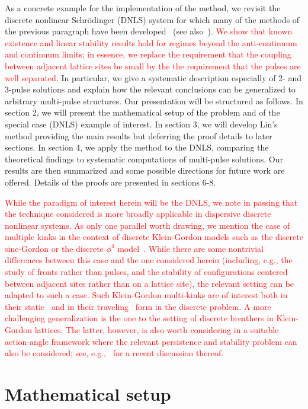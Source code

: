 \documentclass[12pt]{elsarticle}
\newcommand{\revised}[1]{ \textcolor{red}{#1} }
\begin{document}
As a concrete example for the implementation of the method, we revisit the discrete nonlinear Schr{\"o}dinger (DNLS) system for which many of the methods of the previous paragraph have been developed~\cite{Kevrekidis2009} (see also~\cite{pelinovsky_2011}). \revised{We show that known existence and linear stability results hold for regimes beyond the anti-continuum and continuum limits; in essence, we replace the requirement that the coupling between adjacent lattice sites be small by the the requirement that the pulses are well separated.} In particular, we give a systematic description especially of 2- and 3-pulse solutions and explain how the relevant conclusions can be generalized to arbitrary multi-pulse structures. Our presentation will be structured as follows. In section 2, we will present the mathematical setup of the problem and of the special case (DNLS) example of interest. In section 3, we will develop Lin's method providing the main results but deferring the proof details to later sections. In section 4, we apply the method to the DNLS, comparing the theoretical findings to systematic computations of multi-pulse solutions. Our results are then summarized and some possible directions for future work are offered. Details of the proofs are presented in sections 6-8.

\revised{While the paradigm of interest herein will be the
DNLS, we note in passing that the technique considered is
more broadly applicable in dispersive discrete nonlinear
systems. As only one parallel worth drawing, we 
mention the case of multiple kinks in the context
of discrete Klein-Gordon models such as the discrete
sine-Gordon or the discrete $\phi^4$ model~\cite{pgksg}.
While there are some nontrivial differences between
this case and the one considered herein (including, e.g.,
the study of fronts rather than pulses, and the 
stability of configurations centered between adjacent sites
rather than on a lattice site), the relevant setting can
be adapted to such a case. Such Klein-Gordon multi-kinks 
are of interest both in their static~\cite{add1} and in their
traveling~\cite{add2} form in the discrete problem. A more
challenging generalization is the one to the setting
of discrete breathers in Klein-Gordon lattices. The latter,
however, is also worth considering in a suitable 
action-angle framework where the relevant persistence and
stability problem can also be considered; see, e.g.,~\cite{vkouketal} 
for a recent discussion thereof.}

\section{Mathematical setup}
\end{document}
